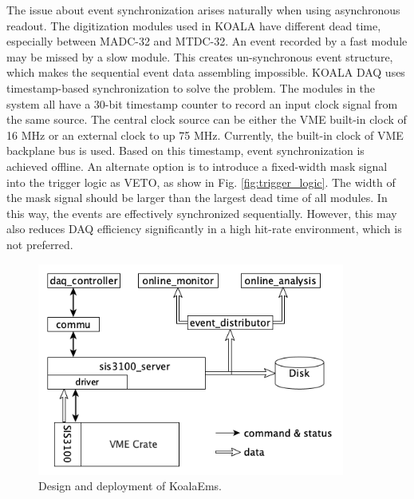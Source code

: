 \documentclass[number]{elsarticle}
\begin{document}
The issue about event synchronization arises naturally when using asynchronous readout.
The digitization modules used in KOALA have different dead time, especially between MADC-32 and MTDC-32.
An event recorded by a fast module may be missed by a slow module. This creates un-synchronous event structure, which makes the sequential event data assembling impossible. 
KOALA DAQ uses timestamp-based synchronization to solve the problem.
The modules in the system all have a 30-bit timestamp counter to record an input clock signal from the same source.
The central clock source can be either the VME built-in clock of 16 MHz or an external clock to up 75 MHz.
Currently, the built-in clock of VME backplane bus is used. 
Based on this timestamp, event synchronization is achieved offline.
An alternate option is to introduce a fixed-width mask signal into the trigger logic as VETO, as show in Fig. \ref{fig:trigger_logic}.
The width of the mask signal should be larger than the largest dead time of all modules.
In this way, the events are effectively synchronized sequentially. 
However, this may also reduces DAQ efficiency significantly in a high hit-rate environment, which is not preferred.

\begin{figure}[htbp]
\centering
\includegraphics[width=0.9\textwidth]{./koalaems_deployment.png}
\caption{Design and deployment of KoalaEms.}
\label{fig:koalaems}
\end{figure}
\end{document}

